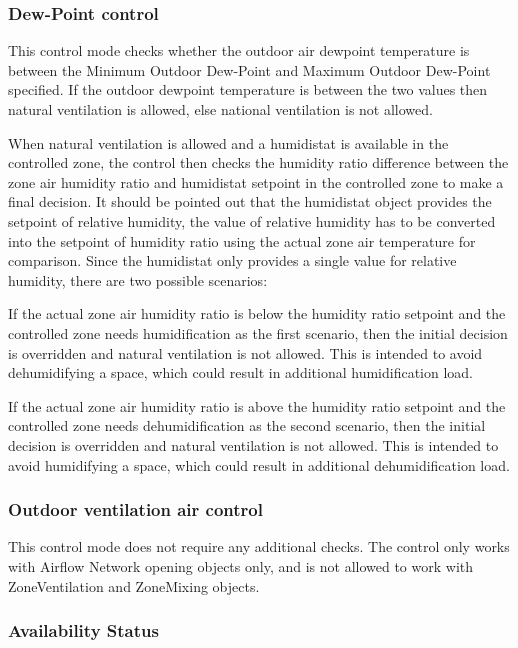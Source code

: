 \subsubsection{Dew-Point control}\label{dew-point-control}

This control mode checks whether the outdoor air dewpoint temperature is between the Minimum Outdoor Dew-Point and Maximum Outdoor Dew-Point specified. If the outdoor dewpoint temperature is between the two values then natural ventilation is allowed, else national ventilation is not allowed.

When natural ventilation is allowed and a humidistat is available in the controlled zone, the control then checks the humidity ratio difference between the zone air humidity ratio and humidistat setpoint in the controlled zone to make a final decision. It should be pointed out that the humidistat object provides the setpoint of relative humidity, the value of relative humidity has to be converted into the setpoint of humidity ratio using the actual zone air temperature for comparison. Since the humidistat only provides a single value for relative humidity, there are two possible scenarios:

If the actual zone air humidity ratio is below the humidity ratio setpoint and the controlled zone needs humidification as the first scenario, then the initial decision is overridden and natural ventilation is not allowed. This is intended to avoid dehumidifying a space, which could result in additional humidification load.

If the actual zone air humidity ratio is above the humidity ratio setpoint and the controlled zone needs dehumidification as the second scenario, then the initial decision is overridden and natural ventilation is not allowed. This is intended to avoid humidifying a space, which could result in additional dehumidification load.

\subsubsection{Outdoor ventilation air control}\label{outdoor-ventilation-air-control}

This control mode does not require any additional checks. The control only works with Airflow Network opening objects only, and is not allowed to work with ZoneVentilation and ZoneMixing objects.

\subsubsection{Availability Status}\label{availability-status}


